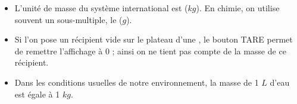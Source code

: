 \begin{mybilan}
	\begin{itemize}
		\item L'unité de masse du système international est  ($kg$). En chimie, on utilise souvent un sous-multiple, le  ($g$).
		\item Si l'on pose un récipient vide sur le plateau d'une , le bouton TARE permet de remettre l'affichage à 0 ; ainsi on ne tient pas compte de la masse de ce  récipient.
		\item Dans les conditions usuelles de notre environnement, la masse de 1 $L$ d'eau est égale à 1 $kg$.
	\end{itemize}
\end{mybilan}